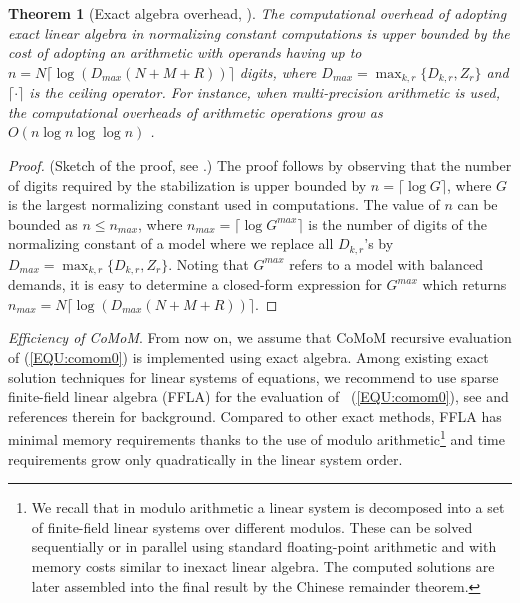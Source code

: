 \documentclass[journal,twocolumn,9.5pt]{IEEEtran}
\newtheorem{theorem}{Theorem}
\begin{document}
\begin{theorem}[Exact algebra overhead, \cite{Cas06b}]
{\em The computational overhead of adopting exact linear algebra in normalizing constant computations is upper bounded by the cost of adopting an arithmetic with operands having up to $n=N\lceil \log(D_{max}(N+M+R)) \rceil$ digits, where $D_{max}=\max_{k,r} \{D_{k,r},Z_r\}$ and $\lceil \cdot \rceil$ is the ceiling operator. For instance, when multi-precision arithmetic is used, the computational overheads of arithmetic operations grow as $O(n \log n \log \log n)$ \cite{SchS71}.}
\end{theorem}
\begin{proof} (Sketch of the proof, see \cite{Cas06b}.) The proof follows by observing that the number of digits required by the stabilization is upper bounded by $n=\lceil \log G \rceil$, where $G$ is the largest normalizing constant used in computations. The value of $n$ can be bounded as $n\leq n_{max}$, where $n_{max}=\lceil \log G^{max} \rceil$ is the number of digits of the normalizing constant of a model where we replace all $D_{k,r}$'s by $D_{max}=\max_{k,r} \{D_{k,r},Z_r\}$. Noting that $G^{max}$ refers to a model with balanced demands, it is easy to determine a closed-form expression for $G^{max}$ which returns $n_{max}=N\lceil \log(D_{max}(N+M+R)) \rceil$.
\end{proof}

{\em Efficiency of CoMoM}. From now on, we assume that CoMoM recursive evaluation of (\ref{EQU:comom0}) is implemented using exact algebra.
Among existing exact solution techniques for linear systems of equations, we recommend to use sparse finite-field linear algebra (FFLA) for the evaluation of ~(\ref{EQU:comom0}), see \cite{Vil07} and references therein for background. Compared to other exact methods, FFLA has minimal memory requirements thanks to the use of modulo arithmetic\footnote{We recall that in modulo arithmetic a linear system is decomposed into a set of finite-field linear systems over different modulos. These can be solved sequentially or in parallel using standard floating-point arithmetic and with memory costs similar to inexact linear algebra. The computed solutions are later assembled into the final result by the Chinese remainder theorem.} and time requirements grow only quadratically in the linear system order.
\end{document}
